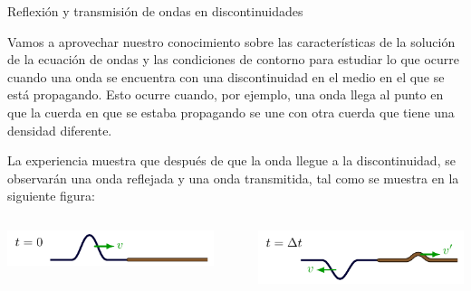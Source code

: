 \documentclass[11pt,handout,aspectratio=1610]{beamer}
\newcommand{\vs}{\vspace{11pt}}
\begin{document}
\begin{frame}{Reflexión y transmisión de ondas en discontinuidades}

    Vamos a aprovechar nuestro conocimiento sobre las características de la solución de la ecuación de ondas y las condiciones de contorno para estudiar lo que ocurre cuando una onda se encuentra con una discontinuidad en el medio en el que se está propagando. Esto ocurre cuando, por ejemplo, una onda llega al punto en que la cuerda en que se estaba propagando se une con otra cuerda que tiene una densidad diferente.

    \vs 

    La experiencia muestra que después de que la onda llegue a la discontinuidad, se observarán una onda reflejada y una onda transmitida, tal como se muestra en la siguiente figura:
    \begin{columns}
        \begin{column}{0.45\textwidth}
            \includegraphics[width=\textwidth]{../figs/waves_reflection_transmission-5.pdf}
        \end{column}
        ~
        \begin{column}{0.45\textwidth}
            \includegraphics[width=\textwidth]{../figs/waves_reflection_transmission-6.pdf}
        \end{column}
    \end{columns}

\end{frame}
\end{document}
